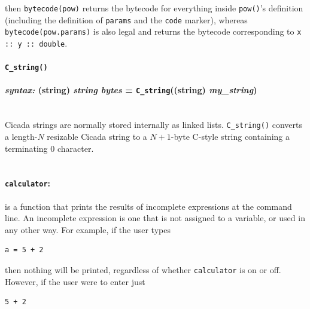 \documentclass{article}
\newenvironment{code}{
       \begin{list}{}{
               \setlength{\leftmargin}{.4in}
               \setlength{\rightmargin}{0in}
               \setlength{\topsep}{.2in}
       }
       \small
       \item[] }
       { \end{list}   }
\begin{document}
\noindent then \verb#bytecode(pow)# returns the bytecode for everything inside \verb#pow()#'s definition (including the definition of \verb#params# and the \verb#code# marker), whereas \verb#bytecode(pow.params)# is also legal and returns the bytecode corresponding to \verb#x :: y :: double#.\\







\paragraph{\texttt{C\_string()}\\\\
\normalfont \emph{syntax: } (string) \emph{string bytes} = \texttt{C\_string}((string) \emph{my\_string})\\\\}

Cicada strings are normally stored internally as linked lists.  \verb#C_string()# converts a length-$N$ resizable Cicada string to a $N+1$-byte C-style string containing a terminating 0 character.\\\\




\paragraph{\texttt{calculator}:} is a function that prints the results of incomplete expressions at the command line.  An incomplete expression is one that is not assigned to a variable, or used in any other way.  For example, if the user types

\begin{code} \begin{verbatim}
a = 5 + 2
\end{verbatim} \end{code}

\noindent then nothing will be printed, regardless of whether \texttt{calculator} is on or off.  However, if the user were to enter just

\begin{code} \begin{verbatim}
5 + 2
\end{verbatim} \end{code}
\end{document}
